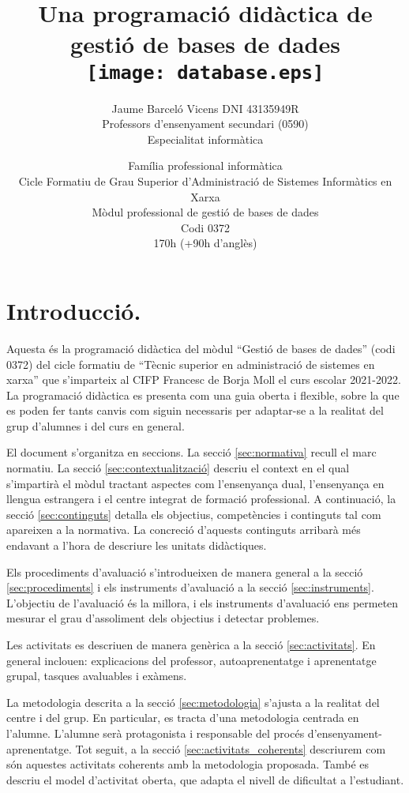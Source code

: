 \documentclass[catalan, a4paper, 12pt, titlepage]{article}
\title{Una programació didàctica de \\
gestió de bases de dades\\
	\texttt{[image: database.eps]}
	}
\author{
	Jaume Barceló Vicens
	DNI 43135949R\\
	Professors d'ensenyament secundari (0590)\\
	Especialitat informàtica}
\date{
	Família professional informàtica \\
	Cicle Formatiu de Grau Superior d’Administració de Sistemes Informàtics en Xarxa\\
	Mòdul professional de gestió de bases de dades\\
	Codi 0372 \\
	170h (+90h d'anglès)\\
	}
\begin{document}
\pagestyle{empty}

\maketitle

\tableofcontents 

\pagestyle{fancy}

\section{Introducció.}

Aquesta és la programació didàctica del mòdul ``Gestió de bases de dades'' (codi 0372) del cicle formatiu de ``Tècnic superior en administració de sistemes en xarxa'' que s'imparteix al CIFP Francesc de Borja Moll el curs escolar 2021-2022.
La programació didàctica es presenta com una guia oberta i flexible, sobre la que es poden fer tants canvis com siguin necessaris per adaptar-se a la realitat del grup d'alumnes i del curs en general.

El document s'organitza en seccions. 
La secció \ref{sec:normativa} recull el marc normatiu.
La secció \ref{sec:contextualització} descriu el context en el qual s'impartirà el mòdul tractant aspectes com l'ensenyança dual, l'ensenyança en llengua estrangera i el centre integrat de formació professional.
A continuació, la secció \ref{sec:continguts} detalla els objectius, competències i continguts tal com apareixen a la normativa.
La concreció d'aquests continguts arribarà més endavant a l'hora de descriure les unitats didàctiques.

Els procediments d'avaluació s'introdueixen de manera general a la secció \ref{sec:procediments} i els instruments d'avaluació a la secció \ref{sec:instruments}.
L'objectiu de l'avaluació és la millora, i els instruments d'avaluació ens permeten mesurar el grau d'assoliment dels objectius i detectar problemes.

Les activitats es descriuen de manera genèrica a la secció \ref{sec:activitats}.
En general inclouen: explicacions del professor, autoaprenentatge i aprenentatge grupal, tasques avaluables i exàmens.

La metodologia descrita a la secció \ref{sec:metodologia} s'ajusta a la realitat del centre i del grup.
En particular, es tracta d'una metodologia centrada en l'alumne.
L'alumne serà protagonista i responsable del procés d'ensenyament-aprenentatge.
Tot seguit, a la secció \ref{sec:activitats_coherents} descriurem com són aquestes activitats coherents amb la metodologia proposada.
També es descriu el model d'activitat oberta, que adapta el nivell de dificultat a l'estudiant.
\end{document}
